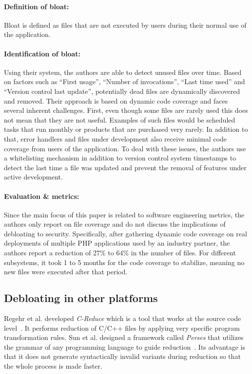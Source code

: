 \paragraph{Definition of bloat:} Bloat is defined as files that are not executed by users during their normal use of the application.
\paragraph{Identification of bloat:} Using their system, the authors are able to detect unused files over time. Based on factors such as ``First usage'', ``Number of invocations'', ``Last time used'' and ``Version control last update'', potentially dead files are dynamically discovered and removed. Their approach is based on dynamic code coverage and faces several inherent challenges. First, even though some files are rarely used this does not mean that they are not useful. Examples of such files would be scheduled tasks that run monthly or products that are purchased very rarely. In addition to that, error handlers and files under development also receive minimal code coverage from users of the application. To deal with these issues, the authors use a whitelisting mechanism in addition to version control system timestamps to detect the last time a file was updated and prevent the removal of features under active development.

\paragraph{Evaluation \& metrics:} Since the main focus of this paper is related to software engineering metrics, the authors only report on file coverage and do not discuss the implications of debloating to security. %
Specifically, after gathering dynamic code coverage on real deployments of multiple PHP applications used by an industry partner, the authors report a reduction of 27\% to 64\% in the number of files. For different subsystems, it took 1 to 5 months for the code coverage to stabilize, meaning no new files were executed after that period.

\subsection{Debloating in other platforms}

Regehr et al. developed \textit{C-Reduce} which is a tool that works at the source code level~\cite{regehr2012CReduce}.
It performs reduction of C/C++ files by applying very specific program transformation rules.
Sun et al. designed a framework called \textit{Perses} that utilizes the grammar of any programming language to guide reduction~\cite{sun2018perses}.
Its advantage is that it does not generate syntactically invalid variants during reduction so that the whole process is made faster.


